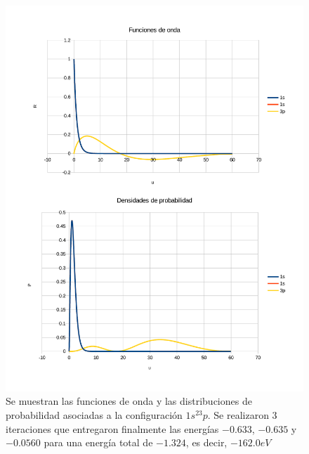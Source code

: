 \documentclass[a4paper]{article}
\begin{document}
\begin{figure}
\begin{center}
\includegraphics[width = \textwidth]{1s_1s_3p.pdf}
\caption{\label{fig:3p}Se muestran las funciones de onda y las distribuciones de probabilidad asociadas a la configuración $1s^23p$. Se realizaron 3 iteraciones que entregaron finalmente las energías $-0.633$, $-0.635$ y $-0.0560$ para una energía total de $-1.324$, es decir, $-162.0eV$}
\end{center}
\end{figure}
\end{document}
